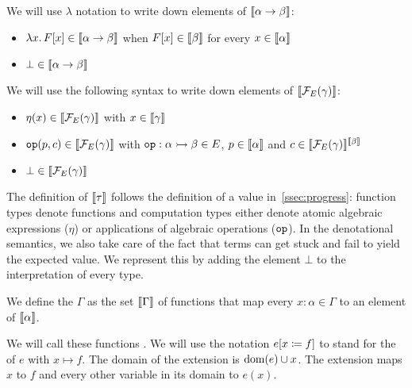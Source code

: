 \begin{notation}
  We will use $\lambda$ notation to write down elements of
  $\llbracket \alpha \to \beta \rrbracket$:
  
  \begin{itemize}
  \item $\lambda x.\, F[x] \in \llbracket \alpha \to \beta \rrbracket$ when
    $F[x] \in \llbracket \beta \rrbracket$ for every $x \in \llbracket \alpha \rrbracket$
  \item $\bot \in \llbracket \alpha \to \beta \rrbracket$
  \end{itemize}

  We will use the following syntax to write down elements of
  $\llbracket \mathcal{F}_E(\gamma) \rrbracket$:
  
  \begin{itemize}
  \item $\eta(x) \in \llbracket \mathcal{F}_E(\gamma) \rrbracket$ with $x \in \llbracket \gamma \rrbracket$
  \item $\mathtt{op}(p,c) \in \llbracket \mathcal{F}_E(\gamma) \rrbracket$ with
    $\mathtt{op} : \alpha \rightarrowtail \beta \in E$, $p \in \llbracket \alpha \rrbracket$ and
    $c \in \llbracket \mathcal{F}_E(\gamma) \rrbracket^{\llbracket \beta \rrbracket}$
  \item $\bot \in \llbracket \mathcal{F}_E(\gamma) \rrbracket$
  \end{itemize}
\end{notation}

The definition of $\llbracket \tau \rrbracket$ follows the definition of a value
in~\ref{ssec:progress}: function types denote functions and computation
types either denote atomic algebraic expressions ($\eta$) or applications
of algebraic operations ($\mathtt{op}$). In the denotational semantics, we also
take care of the fact that terms can get stuck and fail to yield the
expected value. We represent this by adding the element $\bot$ to the
interpretation of every type.

\begin{definition}
  We define the  $\Gamma$
  as the set $\llbracket \Gamma \rrbracket$ of functions that map every
  $x : \alpha \in \Gamma$ to an element of $\llbracket \alpha \rrbracket$.
  
  We will call these functions . We will use the notation
  $e[x \coloneqq f]$ to stand for the  of $e$ with
  $x \mapsto f$. The domain of the extension is $\operatorname{dom}(e) \cup x$. The
  extension maps $x$ to $f$ and every other variable in its domain to
  $e(x)$.
\end{definition}

